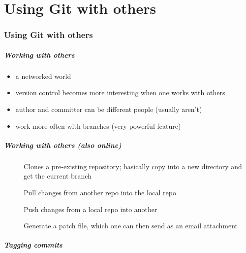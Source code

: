 \documentclass{git_course}
\begin{document}
\maketitle

\part{Using Git with others}

\begin{frame}
    \partpage
\end{frame}

\section{Using Git with others}

\begin{frame}
\frametitle{Working with others}
\begin{itemize}
    \item a networked world
    \item version control becomes more interesting when one works with
        others
    \item author and committer can be different people (usually aren't)
    \item work more often with branches (very powerful feature)
\end{itemize}
\end{frame}

\begin{frame}
\frametitle{Working with others (also online)}

\begin{description}
    \item[] Clones a pre-existing repository; basically copy
        into a new directory and get the current branch
    \item[] Pull changes from another repo into the local repo
    \item[] Push changes from a local repo into another
    \item[] Generate a patch file, which one can
        then send as an email attachment
\end{description}
\end{frame}

\begin{frame}
\frametitle{Tagging commits}
\end{frame}
\end{document}
